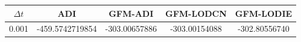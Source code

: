 \begin{table}[!ht]
\centering
\begin{tabular}{c c c c c }
\hline
$\Delta t$  & ADI  & GFM-ADI       & GFM-LODCN     & GFM-LODIE     \\ \hline
0.001 & -459.5742719854 & -303.00657886  & -303.00154088   & -302.80556740 \\

\end{tabular}
\end{table}
